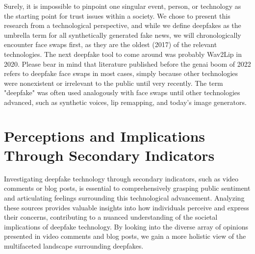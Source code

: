 \documentclass[
  a4paper,  %
  twoside,  %
  bibliography=totoc,
  headsepline,
  cleardoublepage=empty,
  parskip=half,
  draft=false
]{scrbook}
\begin{document}
Surely, it is impossible to pinpoint one singular event, person, or technology as the starting point for trust issues within a society. We chose to present this research from a technological perspective, and while we define deepfakes as the umbrella term for all synthetically generated fake news, we will chronologically encounter face swaps first, as they are the oldest (2017) of the relevant technologies. The next deepfake tool to come around was probably Wav2Lip in 2020. Please bear in mind that literature published before the \gls{genai} boom of 2022 refers to deepfake face swaps in most cases, simply because other technologies were nonexistent or irrelevant to the public until very recently. The term "deepfake" was often used analogously with face swaps until other technologies advanced, such as synthetic voices, lip remapping, and today's image generators.

\section{Perceptions and Implications Through Secondary Indicators} 
\label{sec:rel-secondary}

Investigating deepfake technology through secondary indicators, such as video comments or blog posts, is essential to comprehensively grasping public sentiment and articulating feelings surrounding this technological advancement. Analyzing these sources provides valuable insights into how individuals perceive and express their concerns, contributing to a nuanced understanding of the societal implications of deepfake technology. By looking into the diverse array of opinions presented in video comments and blog posts, we gain a more holistic view of the multifaceted landscape surrounding deepfakes.
\end{document}
